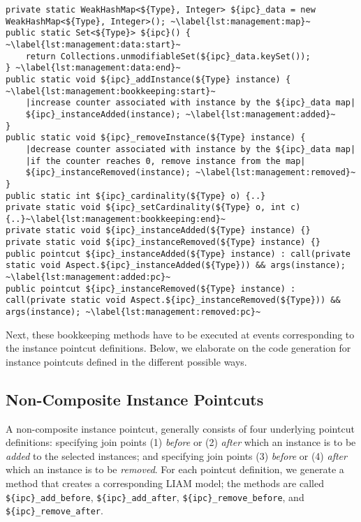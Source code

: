 \begin{lstlisting}[float, caption={Template of generated code for instance set management.},label=lst:management]
private static WeakHashMap<${Type}, Integer> ${ipc}_data = new WeakHashMap<${Type}, Integer>(); ~\label{lst:management:map}~
public static Set<${Type}> ${ipc}() { ~\label{lst:management:data:start}~
	return Collections.unmodifiableSet(${ipc}_data.keySet());
} ~\label{lst:management:data:end}~
public static void ${ipc}_addInstance(${Type} instance) { ~\label{lst:management:bookkeeping:start}~
	|increase counter associated with instance by the ${ipc}_data map|
	${ipc}_instanceAdded(instance); ~\label{lst:management:added}~
}
public static void ${ipc}_removeInstance(${Type} instance) {
	|decrease counter associated with instance by the ${ipc}_data map|
	|if the counter reaches 0, remove instance from the map|
	${ipc}_instanceRemoved(instance); ~\label{lst:management:removed}~
} 
public static int ${ipc}_cardinality(${Type} o) {..}
private static void ${ipc}_setCardinality(${Type} o, int c){..}~\label{lst:management:bookkeeping:end}~
private static void ${ipc}_instanceAdded(${Type} instance) {}
private static void ${ipc}_instanceRemoved(${Type} instance) {}
public pointcut ${ipc}_instanceAdded(${Type} instance) : call(private static void Aspect.${ipc}_instanceAdded(${Type})) && args(instance); ~\label{lst:management:added:pc}~
public pointcut ${ipc}_instanceRemoved(${Type} instance) : call(private static void Aspect.${ipc}_instanceRemoved(${Type})) && args(instance); ~\label{lst:management:removed:pc}~
\end{lstlisting}

Next, these bookkeeping methods have to be executed at events corresponding to the instance pointcut definitions.
Below, we elaborate on the code generation for instance pointcuts defined in the different possible ways.

\subsection{Non-Composite Instance Pointcuts}

A non-composite instance pointcut, generally consists of four underlying pointcut definitions: specifying join points (1) \emph{before} or (2) \emph{after} which an instance is to be \emph{added} to the selected instances; and specifying join points (3) \emph{before} or (4) \emph{after} which an instance is to be \emph{removed}.
For each pointcut definition, we generate a method that creates a corresponding LIAM model; the methods are called \lstinline!${ipc}_add_before!, \lstinline!${ipc}_add_after!, \lstinline!${ipc}_remove_before!, and \lstinline!${ipc}_remove_after!.

